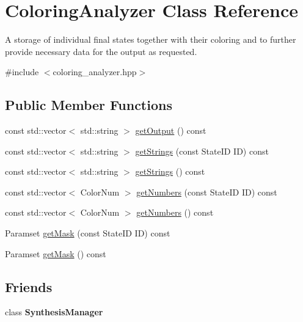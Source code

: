 \hypertarget{classColoringAnalyzer}{\section{\-Coloring\-Analyzer \-Class \-Reference}
\label{classColoringAnalyzer}
}


\-A storage of individual final states together with their coloring and to further provide necessary data for the output as requested.  




{\ttfamily \#include $<$coloring\-\_\-analyzer.\-hpp$>$}

\subsection*{\-Public \-Member \-Functions}
\begin{DoxyCompactItemize}
\item 
const std\-::vector$<$ std\-::string $>$ \hyperlink{classColoringAnalyzer_ac0fff9753064754b7966c48f2cae7aee}{get\-Output} () const 
\item 
const std\-::vector$<$ std\-::string $>$ \hyperlink{classColoringAnalyzer_ac4c6f413fb0f55f5861ffdd12a9380d7}{get\-Strings} (const \-State\-I\-D \-I\-D) const 
\item 
const std\-::vector$<$ std\-::string $>$ \hyperlink{classColoringAnalyzer_a0300b8f6477ca1c8b0abc936e6ed2837}{get\-Strings} () const 
\item 
const std\-::vector$<$ \-Color\-Num $>$ \hyperlink{classColoringAnalyzer_af99abef2a9541c6346fee2965f4dc0b6}{get\-Numbers} (const \-State\-I\-D \-I\-D) const 
\item 
const std\-::vector$<$ \-Color\-Num $>$ \hyperlink{classColoringAnalyzer_a97cf3d6513f903b8ea0c115c7e2961b6}{get\-Numbers} () const 
\item 
\-Paramset \hyperlink{classColoringAnalyzer_a64e77cbc80b792ce5f4f06d1dedd6c31}{get\-Mask} (const \-State\-I\-D \-I\-D) const 
\item 
\-Paramset \hyperlink{classColoringAnalyzer_a4f1587d869c8ca167d7261e9deed290d}{get\-Mask} () const 
\end{DoxyCompactItemize}
\subsection*{\-Friends}
\begin{DoxyCompactItemize}
\item 
\hypertarget{classColoringAnalyzer_a1d08da922bb492eb0ec8123e88cbecb5}{class {\bfseries \-Synthesis\-Manager}}\label{classColoringAnalyzer_a1d08da922bb492eb0ec8123e88cbecb5}

\end{DoxyCompactItemize}


